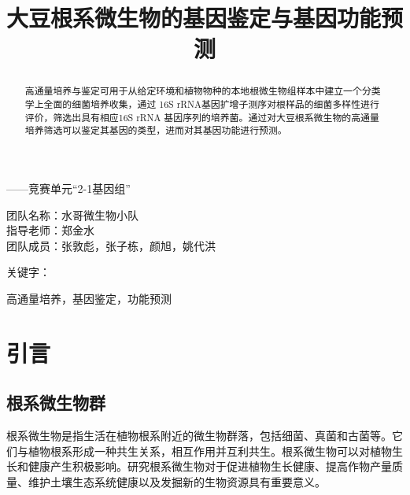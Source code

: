 \documentclass[UTF8]{ctexart}
\author{}
\date{}
\title{\vspace*{-1.5cm} \CJKfontspec{SimHei}大豆根系微生物的基因鉴定与基因功能预测}
\begin{document}
    \maketitle\thispagestyle{fancy}
    \vspace*{-1.5cm}

    \begin{flushright}
        { \heiti  ——竞赛单元“2-1基因组”}

        \vspace*{\baselineskip} 

        团队名称：水哥微生物小队\\
        指导老师：郑金水\\
        团队成员：张敦彪，张子栋，颜旭，姚代洪\\
    \end{flushright}


    \begin{abstract}
        高通量培养与鉴定\textsuperscript{\cite{ref1}}可用于从给定环境和植物物种的本地根微生物组样本中建立一个分类学上全面的细菌培养收集，通过 16S rRNA基因扩增子测序对根样品的细菌多样性进行评价，筛选出具有相应16S rRNA 基因序列的培养菌。通过对大豆根系微生物的高通量培养筛选可以鉴定其基因的类型，进而对其基因功能进行预测。
    \end{abstract}
    

    {\heiti {} \raggedright 关键字：} { 高通量培养，基因鉴定，功能预测}

    




    \section{引言}

    \subsection{根系微生物群}

    根系微生物是指生活在植物根系附近的微生物群落，包括细菌、真菌和古菌等。它们与植物根系形成一种共生关系，相互作用并互利共生。根系微生物可以对植物生长和健康产生积极影响。研究根系微生物对于促进植物生长健康、提高作物产量质量、维护土壤生态系统健康以及发掘新的生物资源具有重要意义。
    
\end{document}
